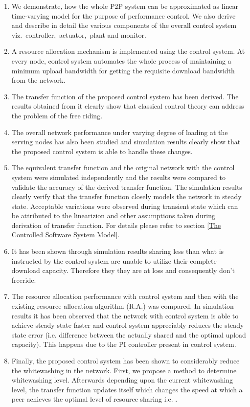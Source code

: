 \documentclass[journal]{IEEEtran}
\begin{document}
\begin{enumerate}
	\item We demonstrate, how the whole P2P system can be approximated as linear time-varying model for the purpose of performance control. We also derive and describe in detail the various components of the overall control system viz.~controller,~actuator,~plant and monitor.
	\item  A resource allocation mechanism  is implemented using the control system.  At every node, control system automates the whole process of maintaining a minimum upload bandwidth for getting the requisite download bandwidth from the network.
	\item The transfer function of the proposed control system has been derived. The results obtained from it clearly show that classical control theory can address the problem of the free riding. 
	\item The overall network performance under varying degree of loading at the serving nodes has also been studied and simulation results clearly show that the proposed control system is able to handle these changes.
	\item The equivalent transfer function and the original network with the control system were simulated independently and the results were compared to validate the accuracy of the derived transfer function. The simulation results clearly verify that the transfer function closely models the network in steady state. Acceptable variations were observed during transient state which can be attributed to the linearizion \cite{Ogata} and other assumptions taken during derivation of transfer function. For details please refer to section \ref{The Controlled Software System Model}.
	\item It has been shown through simulation results sharing less than what is instructed by the control system are unable to utilize their complete download capacity. Therefore they they are at loss and consequently don't freeride.
	\item The resource allocation performance with control system  and then  with the existing resource allocation algorithm (R.A.) \cite{Satsiou} was compared. In simulation results it has been observed that the network with control system is able to achieve steady state faster and control system appreciably reduces the steady state error (i.e. difference between the actually shared and the optimal upload capacity). This happens due to the PI controller present in control system.
\item Finally, the proposed control system has been shown to considerably reduce the whitewashing in the network. First, we propose a method to determine whitewashing level. Afterwards depending upon the current whitewashing level, the transfer function updates itself which changes the speed at which a peer achieves the optimal level of resource sharing i.e. .
\end{enumerate}
\end{document}
